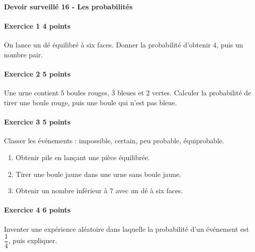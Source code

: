 \documentclass[a4paper,10pt]{article}
\newenvironment{exercice}[2]{\paragraph{Exercice #1 \hfill #2 points}\mbox{}\par}{\medskip}
\begin{document}
\begin{center}\Large\bfseries Devoir surveillé 16 - Les probabilités\end{center}
\vspace{2mm}
\begin{exercice}{1}{4}On lance un dé équilibré à six faces. Donner la probabilité d'obtenir $4$, puis un nombre pair.\end{exercice}\begin{exercice}{2}{5}Une urne contient $5$ boules rouges, $3$ bleues et $2$ vertes. Calculer la probabilité de tirer une boule rouge, puis une boule qui n'est pas bleue.\end{exercice}\begin{exercice}{3}{5}Classer les événements : impossible, certain, peu probable, équiprobable.\begin{enumerate}\item Obtenir pile en lançant une pièce équilibrée.\item Tirer une boule jaune dans une urne sans boule jaune.\item Obtenir un nombre inférieur à $7$ avec un dé à six faces.\end{enumerate}\end{exercice}\begin{exercice}{4}{6}Inventer une expérience aléatoire dans laquelle la probabilité d'un événement est $\dfrac14$, puis expliquer.\end{exercice}
\end{document}
